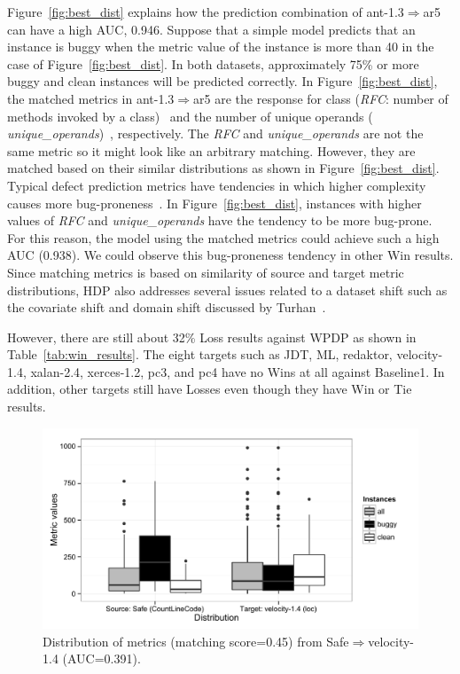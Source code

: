 Figure~\ref{fig:best_dist} explains how the prediction
combination of ant-1.3$\Rightarrow$ar5 can have a high AUC, 0.946. Suppose
that a simple model predicts that an instance is buggy when the metric value of
the instance is more than 40 in the case of Figure~\ref{fig:best_dist}. In both
datasets, approximately 75\% or more buggy and clean instances will be
predicted correctly. In Figure~\ref{fig:best_dist}, the matched metrics in
ant-1.3$\Rightarrow$ar5 are the response for class ({\em RFC}: number of methods
invoked by a class)~\cite{Chidamber94} and the number of unique operands ({\em
unique\_operands})~\cite{Halstead77}, respectively. The {\em RFC} and {\em
unique\_operands} are not the same metric so it might look like an arbitrary
matching. However, they are matched based on their similar distributions as
shown in Figure~\ref{fig:best_dist}. Typical defect prediction metrics have
tendencies in which higher complexity causes more
bug-proneness~\cite{DAmbros12,Menzies07,Rahman13}. In
Figure~\ref{fig:best_dist}, instances with higher values of {\em RFC} and {\em
unique\_operands} have the tendency to be more bug-prone. For this reason, the
model using the matched metrics could achieve such a high AUC (0.938). We could
observe this bug-proneness tendency in other Win results. Since matching metrics is
based on similarity of source and target metric distributions, HDP also
addresses several issues related to a dataset shift such as the covariate shift
and domain shift discussed by Turhan~\cite{Turhan12}.



However, there are still about 32\% Loss results against WPDP as shown in Table~\ref{tab:win_results}. The eight targets such as JDT, ML, redaktor, velocity-1.4, xalan-2.4,
xerces-1.2, pc3, and pc4 have no Wins at all against Baseline1. In
addition, other targets still have Losses even though they have Win or Tie
results.


\begin{figure}[t]
	\centering
	\includegraphics[width=\linewidth]{Figures/Result/loss_dist_bplot.pdf}
	\caption{Distribution of metrics (matching score=0.45)
	from Safe$\Rightarrow$velocity-1.4 (AUC=0.391).}
	\label{fig:loss_dist}
\end{figure}



